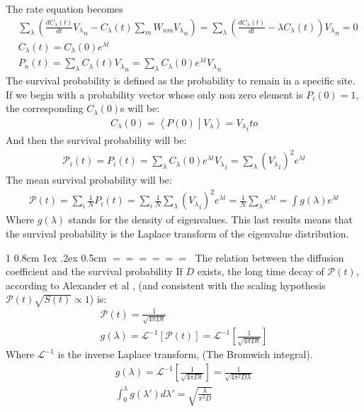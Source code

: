 \documentclass[onecolumn,fleqn,notitlepage,secnumarabic]{revtex4}
\makeatletter
\newcommand{\inner}[2]{\left \langle #1 \middle| #2\right\rangle} %
\def\section{%
  \@startsection
    {section}%
    {1}%
    {\z@}%
    {0.8cm \@plus1ex \@minus .2ex}%
    {0.5cm}%
    {\Large\bf $=\!=\!=\!=\!=\!=\;$}%
}%
\makeatother
\begin{document}
The rate equation becomes
\begin{align}
&\sum_\lambda \left( \frac{dC_\lambda(t)}{dt}{V_\lambda}_n - C_\lambda(t)\sum_m W_{nm}{V_\lambda}_n \right)= \sum_\lambda \left( \frac{dC_\lambda(t)}{dt} - \lambda C_\lambda(t)\right){V_\lambda}_n =0\\
&C_\lambda(t) = C_\lambda(0)e^{\lambda t}\\
&P_n(t) = \sum_\lambda C_\lambda(t) {V_\lambda}_n = \sum_\lambda  C_\lambda(0)e^{\lambda t} {V_\lambda}_n 
\end{align}
The survival probability is defined as the probability to remain in a specific site. If we begin with a probability vector whose only non zero element is $P_i(0)=1$, the corresponding $C_\lambda(0)$s will be:
\begin{align}
C_\lambda(0) = \inner{P(0)}{V_\lambda}= {V_\lambda}_ito
\end{align}
And then the survival probability will be:
\begin{align}
\mathcal{P}_i(t) = P_i(t) = \sum_\lambda  C_\lambda(0)e^{\lambda t} {V_\lambda}_i=\sum_\lambda ({V_\lambda}_i)^2 e^{\lambda t} 
\end{align}
The mean survival probability will be:
\begin{align} \label{eq:surv_eigenvalues}
\mathcal{P}(t) = \sum_i \frac{1}{N} P_i(t)=\sum_i \frac{1}{N} \sum_\lambda ({V_\lambda}_i)^2 e^{\lambda t}  =\frac{1}{N}\sum_\lambda e^{\lambda t} = \int g(\lambda) e^{\lambda t}
\end{align}
Where $g(\lambda)$ stands for the density of eigenvalues. This last results means that the survival probability is the Laplace transform of the eigenvalue distribution.


\section{The relation between the diffusion coefficient and the survival probability}
If $D$ exists, the long time decay of $\mathcal{P}(t)$, according to Alexander et al \cite{Alexander:1981:RMP}, (and consistent with the scaling hypothesis $\mathcal{P}(t)\sqrt{S(t)} \propto 1$) is:
\begin{align}
    \mathcal{P}(t) = \frac{1}{\sqrt{4\pi D t}} \\
    g(\lambda) = \mathcal{L}^{-1}[\mathcal{P}(t)] = \mathcal{L}^{-1}\left[\frac{1}{\sqrt{4\pi D t}}\right]
\end{align}
Where $\mathcal{L}^{-1}$ is the inverse Laplace transform, (The Bromwich integral).
\begin{align}
    g(\lambda) = \mathcal{L}^{-1}\left[\frac{1}{\sqrt{4\pi Dt}}\right] = \frac{1}{\sqrt{4\pi^2 D\lambda}} \\
    \int_0^\lambda g(\lambda')d\lambda' = \sqrt{\frac{\lambda}{\pi^2 D}}
\end{align}
\end{document}
